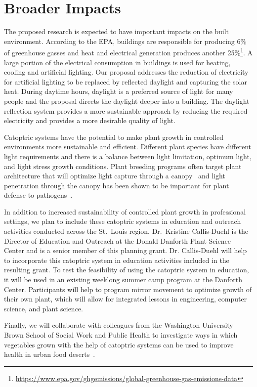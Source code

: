 \section{Broader Impacts}
\label{sec:broader}

The proposed research is expected to have important impacts on the built environment.
According to the EPA, buildings are responsible for producing 6\% of
greenhouse gasses and heat and electrical generation produces another
25\%\footnote{\url{https://www.epa.gov/ghgemissions/global-greenhouse-gas-emissions-data}}.
A large portion of the electrical consumption in buildings is used for
heating, cooling and artificial lighting. Our proposal addresses the
reduction of electricity for artificial lighting to be replaced by
reflected daylight and capturing the solar heat. During daytime hours,
daylight is a preferred source of light for many people and the proposal
directs the daylight deeper into a building. The daylight reflection system
provides a more sustainable approach by reducing the required electricity
and provides a more desirable quality of light.

Catoptric systems have the potential to make plant growth in controlled
environments more sustainable and efficient. Different plant species have
different light requirements and there is a balance between light limitation,
optimum light, and light stress growth conditions. Plant breeding programs
often target plant architecture that will optimize light capture through a
canopy~\cite{burgess17} and light penetration through the canopy has been
shown to be important for plant defense to pathogens~\cite{ballare12}.

In addition to increased sustainability of controlled plant growth in
professional
settings, we plan to include these catoptric systems in education and
outreach activities conducted across the St.~Louis region. Dr.~Kristine
Callis-Duehl is the Director of Education and Outreach at the Donald Danforth
Plant Science Center and is a senior member of this planning grant. Dr.
Callis-Duehl will help to incorporate this catoptric system in education
activities included in the resulting grant. To test the feasibility of using
the catoptric system in education, it will be used in an
existing weeklong summer camp program at the Danforth Center. Participants will
help to program mirror movement to optimize growth of their own plant, which
will allow for integrated lessons in engineering, computer science, and plant
science.  

Finally, we will collaborate with colleagues from the Washington University
Brown School of Social Work and Public Health to investigate ways in which
vegetables grown with the help of catoptric systems can be used to improve
health in urban food deserts~\cite{Walker10}.

